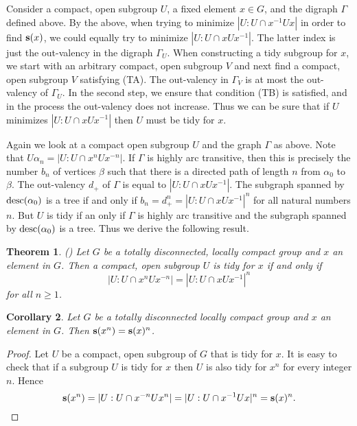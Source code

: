 \documentclass{emsprocart}
\newtheorem{theorem}{Theorem}[section]
\newtheorem{corollary}[theorem]{Corollary}
\theoremstyle{definition}
\begin{document}
Consider a compact, open subgroup $U$, a fixed element $x\in G$, and the
digraph $\Gamma$ defined above.  By the above, when trying to minimize
$|U:U\cap x^{-1}Ux|$ in order to find ${\mbox{\bf s}}(x)$, we could equally try to
minimize $|U:U\cap xUx^{-1}|$.  The latter index is just the
out-valency in the digraph $\Gamma_U$.  When constructing a tidy
subgroup for $x$, we start with an arbitrary compact, open subgroup $V$
and next find a compact, open subgroup $V$ satisfying (TA). The
out-valency in $\Gamma_V$ is at most the out-valency of $\Gamma_U$.
In the second step, we ensure that condition (TB) is satisfied, and
in the process the out-valency does not increase.  Thus we can be sure
that if $U$ minimizes $|U:U\cap xUx^{-1}|$ then $U$ must be tidy for
$x$.

\bigskip

Again we look at a compact open subgroup $U$ and the graph $\Gamma$ as
above.  Note
that $U\alpha_n=|U:U\cap x^nUx^{-n}|$.  If $\Gamma$ is highly arc
transitive, then this is precisely the number $b_n$
of vertices $\beta$ such that
there is a directed path of length $n$ from $\alpha_0$ to $\beta$.
The out-valency $d_+$ of $\Gamma$ is equal to $|U:U\cap xUx^{-1}|$.
The subgraph spanned by ${\mbox{${\rm desc}$}}(\alpha_0)$ is a tree if and only if
 $b_n=d_+^n=|U:U\cap xUx^{-1}|^n$ for all natural numbers $n$.  But $U$ is tidy
if an only if $\Gamma$ is highly arc transitive and the subgraph
spanned by ${\mbox{${\rm desc}$}}(\alpha_0)$ is a tree. Thus we derive
the following result.

\begin{theorem}
 {\rm (\cite[Corollary~3.5]{Moller2002})}
Let $G$ be a totally disconnected, locally compact group and $x$ an
element in $G$.  Then a compact, open subgroup $U$ is tidy for $x$ if
and only if
$$|U:U\cap x^nUx^{-n}|=|U:U\cap xUx^{-1}|^n$$
for all $n\geq 1$.
\end{theorem}

\begin{corollary}
Let $G$ be a totally disconnected locally compact group and $x$ an
element in $G$. Then ${\mbox{\bf s}}(x^n)={\mbox{\bf s}}(x)^n$.
\end{corollary}

\begin{proof}  Let $U$ be a compact, open subgroup of $G$ that is tidy
for $x$.
It is easy to check that if a subgroup $U$ is tidy for
$x$ then $U$ is also tidy for $x^n$ for every integer $n$.
Hence
$${\mbox{\bf s}}(x^n)=|U:U\cap x^{-n}Ux^{n}|=|U:U\cap x^{-1}Ux|^n={\mbox{\bf s}}(x)^n. \qedhere$$
\end{proof}
\end{document}
